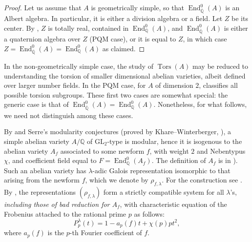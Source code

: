 \documentclass[a4paper,11pt]{amsart}
\theoremstyle{definition}
\newcommand{\Q}{\mathbb Q}
\newcommand{\GL}{\text{GL}}
\DeclareMathOperator{\End}{End}
\DeclareMathOperator{\Tors}{Tors}
\begin{document}
\begin{proof}
Let us assume that \(A\) is geometrically simple, so that \(\End^0_{\overline{\Q}} (A)\) is an Albert algebra. In particular, it is either a division algebra or a field. Let \(Z\) be its center. By \cite[Proposition 5.1, Proposition 5.2, Theorem 5.3 and Proposition 3.6]{Ribet2004AbelianForms}, \(Z\) is totally real, contained in \(\End^0_{\Q} (A)\), and \(\End^0_{\overline{\Q}} (A)\) is either a quaternion algebra over \(Z\) (PQM case), or it is equal to \(Z\), in which case \(Z= \End^0_{\overline{\Q}} (A)= \End^0_{\Q} (A)\) as claimed.
\end{proof}

In the non-geometrically simple case, the study of \(\Tors(A)\) may be reduced to understanding the torsion of smaller dimensional abelian varieties, albeit defined over larger number fields. In the PQM case, for \(A\) of dimension \(2\), \cite{Laga2024RationalMultiplication} classifies all possible torsion subgroups. These first two cases are somewhat special: the generic case is that of \(\End^0_{\overline{\Q}}(A) = \End^0_\Q(A)\). Nonetheless, for what follows, we need not distinguish among these cases.


By \cite[Theorem 4.4]{Ribet2004AbelianForms} and Serre's modularity conjectures \cite{Serre1987SurmathrmGaloverlinemathbfQ/mathbfQ} (proved by Khare--Winterberger, \cite{Khare2009Serresi,Khare2009Serresii}), a simple abelian variety \(A/\Q\) of \(\GL_2\)-type is modular, hence it is isogenous to the abelian variety \(A_f\) associated to some newform \(f\), with weight \(2\) and Nebentypus \(\chi\), and coefficient field equal to \(F=\End^0_\Q(A_f)\). The definition of \(A_f\) is  in \cite[Definition 6.6.3]{Diamond2005AForms}). Such an abelian variety has \(\lambda\)-adic Galois representation isomorphic to that arising from the newform \(f\), which we denote by \(\rho_{f,\lambda}\). For the construction see \cite[\S 9.5]{Diamond2005AForms}. By \cite[Theorem 9.6.5]{Diamond2005AForms}, the representations \((\rho_{f,\lambda})\) form a strictly compatible system for all \(\lambda\)'s, \emph{including those of bad reduction for \(A_f\)}, with characteristic equation of the Frobenius attached to the rational prime \(p\) as follows:
\[
P_p^\lambda(t) = 1 - a_p(f)t + \chi(p) p t^2,
\]
where \(a_p(f)\) is the \(p\)-th Fourier coefficient of \(f\).


\end{document}

